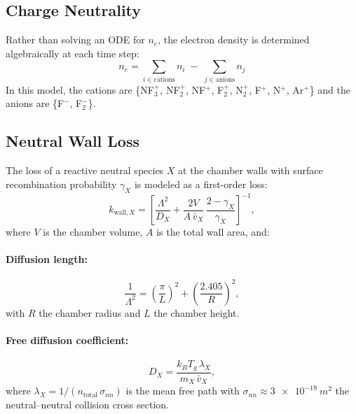\documentclass[11pt,a4paper]{article}
\newcommand{\Tg}{\ensuremath{T_g}}
\renewcommand{\ne}{\ensuremath{n_e}}
\begin{document}
\subsection{Charge Neutrality}
\label{sec:neutrality}

Rather than solving an ODE for $\ne$, the electron density is determined
algebraically at each time step:
\begin{equation}
  \label{eq:neutrality}
  \boxed{
  \ne = \sum_{i \in \text{cations}} n_i \;-\; \sum_{j \in \text{anions}} n_j
  }
\end{equation}
In this model, the cations are \{NF$_3^+$, NF$_2^+$, NF$^+$, F$_2^+$,
N$_2^+$, F$^+$, N$^+$, Ar$^+$\} and the anions are \{F$^-$, F$_2^-$\}.


\subsection{Neutral Wall Loss}
\label{sec:neutral_wall}

The loss of a reactive neutral species $X$ at the chamber walls with surface
recombination probability $\gamma_X$ is modeled as a first-order loss:
\begin{equation}
  \label{eq:neutral_wall}
  k_{\text{wall},X} = \left[
    \frac{\Lambda^2}{D_X} + \frac{2V}{A\,\bar{v}_X}\,\frac{2-\gamma_X}{\gamma_X}
  \right]^{-1},
\end{equation}
where $V$ is the chamber volume, $A$ is the total wall area, and:

\paragraph{Diffusion length:}
\begin{equation}
  \label{eq:diff_length}
  \frac{1}{\Lambda^2} = \left(\frac{\pi}{L}\right)^{\!2}
    + \left(\frac{2.405}{R}\right)^{\!2},
\end{equation}
with $R$ the chamber radius and $L$ the chamber height.

\paragraph{Free diffusion coefficient:}
\begin{equation}
  \label{eq:diffusion}
  D_X = \frac{k_B\Tg\,\lambda_X}{m_X\,\bar{v}_X},
\end{equation}
where $\lambda_X = 1/(n_{\text{total}}\,\sigma_{nn})$ is the mean free path
with $\sigma_{nn} \approx \SI{3e-19}{m^2}$ the neutral--neutral collision cross
section.
\end{document}
